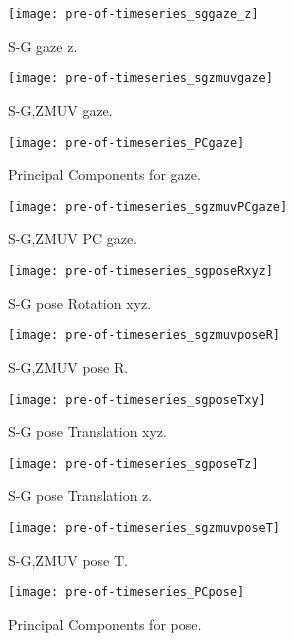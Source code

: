 \documentclass[a4paper,12pt]{article}
\begin{document}
\begin{figure}
\centering
\texttt{[image: pre-of-timeseries\_sggaze\_z]}
\caption{S-G gaze z.}
\end{figure}

\begin{figure}
\centering
\texttt{[image: pre-of-timeseries\_sgzmuvgaze]}
\caption{S-G,ZMUV gaze.}
\end{figure}


\begin{figure}
\centering
\texttt{[image: pre-of-timeseries\_PCgaze]}
\caption{Principal Components for gaze.}
\end{figure}

\begin{figure}
\centering
\texttt{[image: pre-of-timeseries\_sgzmuvPCgaze]}
\caption{S-G,ZMUV PC gaze.}
\end{figure}





\begin{figure}
\centering
\texttt{[image: pre-of-timeseries\_sgposeRxyz]}
\caption{S-G pose Rotation xyz.}
\end{figure}

\begin{figure}
\centering
\texttt{[image: pre-of-timeseries\_sgzmuvposeR]}
\caption{S-G,ZMUV pose R.}
\end{figure}


\begin{figure}
\centering
\texttt{[image: pre-of-timeseries\_sgposeTxy]}
\caption{S-G pose Translation xyz.}
\end{figure}

\begin{figure}
\centering
\texttt{[image: pre-of-timeseries\_sgposeTz]}
\caption{S-G pose Translation z.}
\end{figure}

\begin{figure}
\centering
\texttt{[image: pre-of-timeseries\_sgzmuvposeT]}
\caption{S-G,ZMUV pose T.}
\end{figure}



\begin{figure}
\centering
\texttt{[image: pre-of-timeseries\_PCpose]}
\caption{Principal Components for pose.}
\end{figure}
\end{document}
